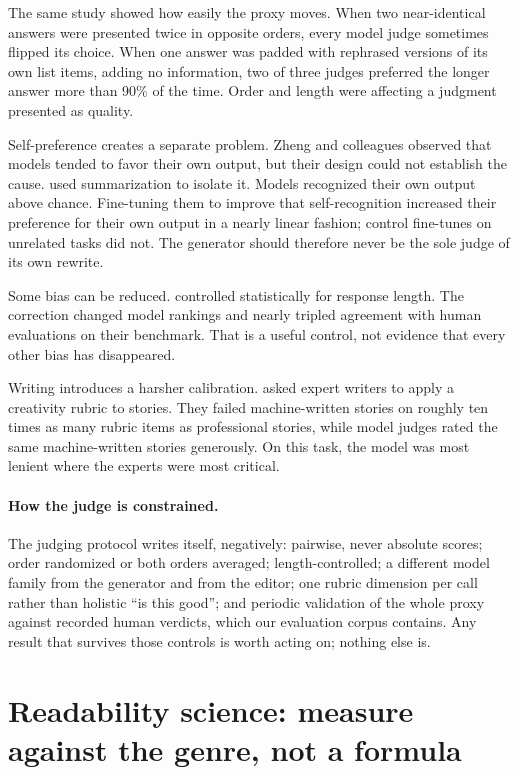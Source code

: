 The same study showed how easily the proxy moves. When two near-identical
answers were presented twice in opposite orders, every model judge sometimes
flipped its choice. When one answer was padded with rephrased versions of its
own list items, adding no information, two of three judges preferred the
longer answer more than 90\% of the time. Order and length were affecting a
judgment presented as quality.

Self-preference creates a separate problem. Zheng and colleagues observed that
models tended to favor their own output, but their design could not establish
the cause. \citet{panickssery2024llm} used summarization to isolate it. Models
recognized their own output above chance. Fine-tuning them to improve that
self-recognition increased their preference for their own output in a nearly
linear fashion; control fine-tunes on unrelated tasks did not. The generator
should therefore never be the sole judge of its own rewrite.

Some bias can be reduced. \citet{dubois2024length} controlled statistically for
response length. The correction changed model rankings and nearly tripled
agreement with human evaluations on their benchmark. That is a useful control,
not evidence that every other bias has disappeared.

Writing introduces a harsher calibration. \citet{chakrabarty2024art} asked
expert writers to apply a creativity rubric to stories. They failed
machine-written stories on roughly ten times as many rubric items as
professional stories, while model judges rated the same machine-written
stories generously. On this task, the model was most lenient where the experts
were most critical.

\paragraph{How the judge is constrained.} The judging protocol writes
itself, negatively: pairwise, never absolute scores; order randomized or
both orders averaged; length-controlled; a different model family from the
generator and from the editor; one rubric dimension per call rather than
holistic ``is this good''; and periodic validation of the whole proxy
against recorded human verdicts, which our evaluation corpus contains. Any
result that survives those controls is worth acting on; nothing else is.

\hvFigureJudgeProtocol

\section{Readability science: measure against the genre, not a formula}
\label{sec:lit-readability}


